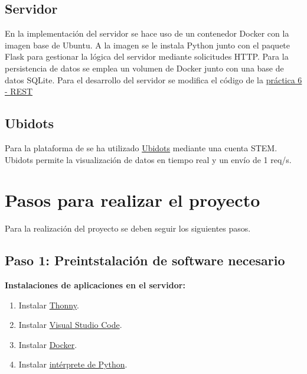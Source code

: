 \documentclass{article}
\begin{document}
\subsection{Servidor}
En la implementación del servidor se hace uso de un contenedor Docker con la imagen base de Ubuntu. 
A la imagen se le instala Python junto con el paquete Flask para gestionar la lógica del servidor mediante solicitudes HTTP. 
Para la persistencia de datos se emplea un volumen de Docker junto con una base de datos SQLite.
Para el desarrollo del servidor se modifica el código de la \href{https://pmanzoni.notion.site/LAB-6-REST-d487dab1b7e24d56b31d8e552a480888}{práctica 6 - REST} \cite{manzoni2024lab6}


\subsection{Ubidots}
Para la plataforma de se ha utilizado \href{https://stem.ubidots.com/}{Ubidots} mediante una cuenta STEM. Ubidots permite la visualización de datos en tiempo real y un envío de 1 req/s.

\section{Pasos para realizar el proyecto}
Para la realización del proyecto se deben seguir los siguientes pasos.
\subsection{Paso 1: Preintstalación de software necesario}
\textbf{Instalaciones de aplicaciones en el servidor:}
\begin{enumerate}
    \item Instalar \href{https://thonny.org/}{Thonny}.
    \item Instalar \href{https://code.visualstudio.com/download}{Visual Studio Code}.
    \item Instalar \href{https://docs.docker.com/get-docker/}{Docker}.
    \item Instalar \href{https://kinsta.com/es/base-de-conocimiento/instalar-python/}{intérprete de Python}.
\end{enumerate}
\end{document}
